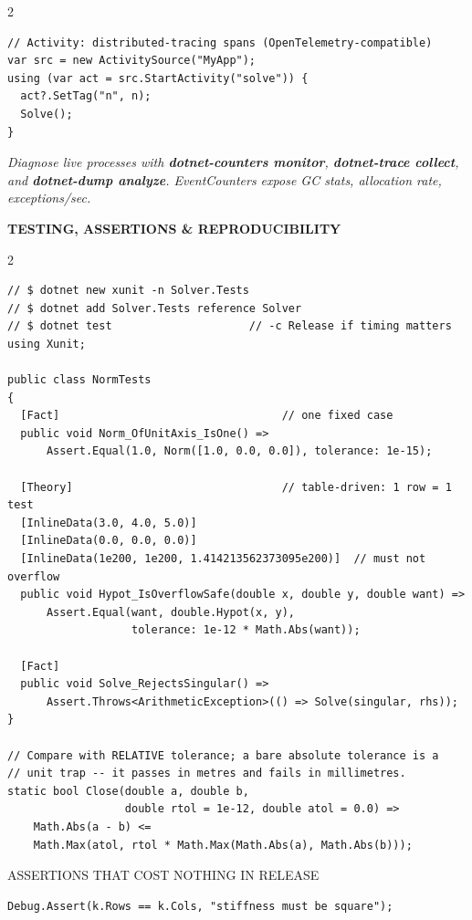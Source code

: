 \documentclass[9pt,a4paper]{extarticle}
\newenvironment{card}[3][acBlue]{%
  \begin{tcolorbox}[
    enhanced, colback=#2, colframe=bdCard,
    coltitle=black, colbacktitle=#2!70!bgHdr,
    fonttitle=\bfseries\fontsize{6.16pt}{7.48pt}\selectfont\MakeUppercase,
    title={#3},
    left=3pt, right=2pt, top=1.4pt, bottom=1.8pt,
    toptitle=1pt, bottomtitle=1pt,
    boxrule=0.4pt,
    borderline west={3pt}{0pt}{#1},
    arc=2pt, before skip=0pt, after skip=1.6mm,
    breakable, toprule at break=0pt, bottomrule at break=0pt,
  ]}{\end{tcolorbox}}
\newcommand{\sectionbanner}[1]{%
  \vspace{0.4mm}%
  {\setlength{\fboxsep}{1.5pt}%
   \colorbox{secBg}{\color{white}\bfseries\fontsize{6.6pt}{7.9pt}\selectfont
   \MakeUppercase{\hspace{0.5mm}#1\hspace{0.5mm}}}%
  }\vspace{1.3mm}\par\nobreak}
\newcommand{\sub}[1]{%
  \par\vspace{1.5pt}%
  {\fontsize{5.7pt}{7pt}\selectfont\color{gray}\MakeUppercase{#1}}\par
  \vspace{0.5pt}}
\newcommand{\code}[1]{{\ttfamily\bfseries #1}}
\newcommand{\note}[1]{\par\noindent
  \begin{minipage}{\linewidth}%
  {\fontsize{5.6pt}{6.8pt}\selectfont\itshape #1}%
  \end{minipage}\par}
\begin{document}
\begin{multicols}{2}
\begin{card}[acRed]{bgRed}{Attributes, Reflection \& Source Gen}
\begin{lstlisting}[style=cs]
// Activity: distributed-tracing spans (OpenTelemetry-compatible)
var src = new ActivitySource("MyApp");
using (var act = src.StartActivity("solve")) {
  act?.SetTag("n", n);
  Solve();
}
\end{lstlisting}
\note{Diagnose live processes with \code{dotnet-counters monitor},
\code{dotnet-trace collect}, and \code{dotnet-dump analyze}.
EventCounters expose GC stats, allocation rate, exceptions/sec.}
\end{card}

\end{multicols}

\sectionbanner{Testing, Assertions \& Reproducibility}
\begin{multicols}{2}

\begin{card}[acGreen]{bgGreen}{Unit Tests for Numerical Code}
\begin{lstlisting}[style=cs]
// $ dotnet new xunit -n Solver.Tests
// $ dotnet add Solver.Tests reference Solver
// $ dotnet test                     // -c Release if timing matters
using Xunit;

public class NormTests
{
  [Fact]                                  // one fixed case
  public void Norm_OfUnitAxis_IsOne() =>
      Assert.Equal(1.0, Norm([1.0, 0.0, 0.0]), tolerance: 1e-15);

  [Theory]                                // table-driven: 1 row = 1 test
  [InlineData(3.0, 4.0, 5.0)]
  [InlineData(0.0, 0.0, 0.0)]
  [InlineData(1e200, 1e200, 1.414213562373095e200)]  // must not overflow
  public void Hypot_IsOverflowSafe(double x, double y, double want) =>
      Assert.Equal(want, double.Hypot(x, y),
                   tolerance: 1e-12 * Math.Abs(want));

  [Fact]
  public void Solve_RejectsSingular() =>
      Assert.Throws<ArithmeticException>(() => Solve(singular, rhs));
}

// Compare with RELATIVE tolerance; a bare absolute tolerance is a
// unit trap -- it passes in metres and fails in millimetres.
static bool Close(double a, double b,
                  double rtol = 1e-12, double atol = 0.0) =>
    Math.Abs(a - b) <=
    Math.Max(atol, rtol * Math.Max(Math.Abs(a), Math.Abs(b)));
\end{lstlisting}
\sub{Assertions that cost nothing in Release}
\begin{lstlisting}[style=cs]
Debug.Assert(k.Rows == k.Cols, "stiffness must be square");


\end{lstlisting}
\end{card}
\end{multicols}
\end{document}
